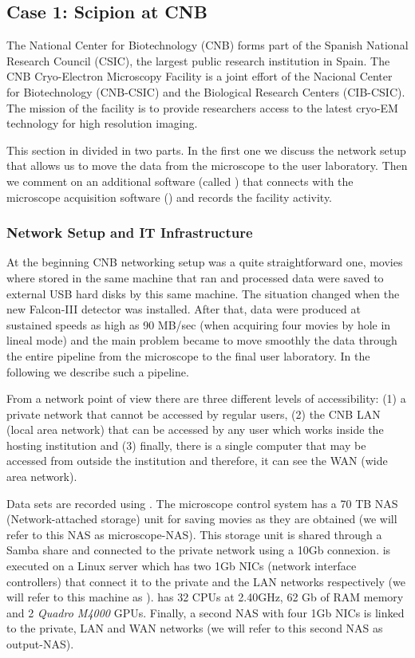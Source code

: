 \subsection{Case 1: Scipion at CNB}
The National Center for Biotechnology (CNB) forms part of the Spanish National Research Council (CSIC), the largest public research institution in Spain. 
The CNB Cryo-Electron Microscopy Facility is a joint effort of the Nacional Center for Biotechnology (CNB-CSIC) and the Biological Research Centers (CIB-CSIC). The mission of the facility is to provide researchers access to the latest cryo-EM technology for high resolution imaging. 

This section in divided in two parts. In the first one we discuss the network setup that allows us to move the data from the microscope to the user laboratory. Then  we comment on an additional software (called  \emadmin) that connects \scipion with the microscope acquisition software (\epu) and records the facility activity.

\subsubsection{Network Setup and IT Infrastructure}

At the beginning CNB networking setup was a quite straightforward one, movies where stored in the  same machine that ran \scipion and processed data were saved to external USB hard disks by this same machine. The situation changed when the new Falcon-III detector was installed. After that, data were produced at sustained speeds as high as 90 MB/sec (when acquiring four movies by hole in lineal mode) and the main problem became to move smoothly the data through the entire pipeline from the microscope to the final user laboratory. In the following we describe such a pipeline.

From a network point of view there are three different levels of accessibility: (1) a private network that cannot be accessed by regular users, (2) the CNB LAN (local area network)  that can be accessed by any user which works inside the hosting  institution and (3) finally, there is a single computer that may be accessed from outside the institution and therefore, it can see the WAN (wide area network).

Data sets are recorded using \epu. The microscope control system has a 70 TB NAS (Network-attached storage) unit for saving movies as they are obtained (we will refer to this NAS as microscope-NAS). This storage unit is shared through a Samba share and connected to the private network using a 10Gb connexion. \scipion is executed on a Linux server which has two 1Gb NICs (network interface controllers) that connect it to the private and the LAN networks respectively (we will refer to this machine as \scipionbox). \scipionbox has 32 CPUs at 2.40GHz, 62 Gb of RAM memory and 2 \textit{Quadro M4000} GPUs. Finally, a second NAS with four 1Gb NICs is linked to the private, LAN and WAN networks (we will refer to this second NAS as output-NAS).

